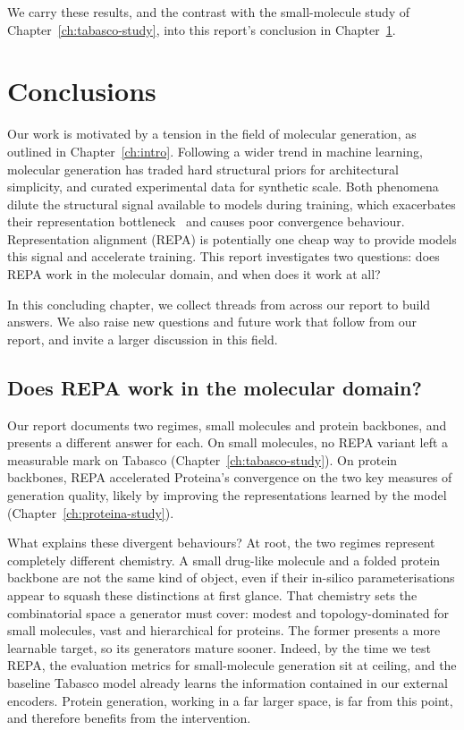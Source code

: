 \documentclass[12pt,a4paper,twoside]{report}
\begin{document}
We carry these results, and the contrast with the small-molecule study of Chapter~\ref{ch:tabasco-study}, into this report's conclusion in Chapter~\ref{ch:conclusions}.

\chapter{Conclusions}
\label{ch:conclusions}



Our work is motivated by a tension in the field of molecular generation, as outlined in Chapter~\ref{ch:intro}. Following a wider trend in machine learning, molecular generation has traded hard structural priors for architectural simplicity, and curated experimental data for synthetic scale. Both phenomena dilute the structural signal available to models during training, which exacerbates their representation bottleneck~\cite{REPA} and causes poor convergence behaviour. Representation alignment (REPA) is potentially one cheap way to provide models this signal and accelerate training. This report investigates two questions: does REPA work in the molecular domain, and when does it work at all?

In this concluding chapter, we collect threads from across our report to build answers. We also raise new questions and future work that follow from our report, and invite a larger discussion in this field.

\section{Does REPA work in the molecular domain?}
\label{sec:concl-domain}

Our report documents two regimes, small molecules and protein backbones, and presents a different answer for each. On small molecules, no REPA variant left
a measurable mark on Tabasco (Chapter~\ref{ch:tabasco-study}). On protein backbones, REPA accelerated Proteina's convergence on the two key measures of generation quality, likely by improving the representations learned by the model (Chapter~\ref{ch:proteina-study}).

What explains these divergent behaviours? At root, the two regimes represent completely different chemistry. A small drug-like molecule and a folded protein backbone are not the same kind of object, even if their in-silico parameterisations appear to squash these distinctions at first glance. That chemistry sets the combinatorial space a generator must cover: modest and topology-dominated for small molecules, vast and hierarchical for proteins. The former presents a more learnable target, so its generators mature sooner. Indeed, by the time we test REPA, the evaluation metrics for small-molecule generation sit at ceiling, and the baseline Tabasco model already learns the information contained in our external encoders. Protein generation, working in a far larger space, is far from this point, and therefore benefits from the intervention.
\end{document}
